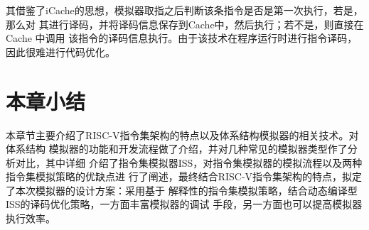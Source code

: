 其借鉴了iCache的思想，模拟器取指之后判断该条指令是否是第一次执行，若是，那么对
其进行译码，并将译码信息保存到Cache中，然后执行；若不是，则直接在 Cache 中调用
该指令的译码信息执行。由于该技术在程序运行时进行指令译码，因此很难进行代码优化。

\section{本章小结}
本章节主要介绍了RISC-V指令集架构的特点以及体系结构模拟器的相关技术。对体系结构
模拟器的功能和开发流程做了介绍，并对几种常见的模拟器类型作了分析对比，其中详细
介绍了指令集模拟器ISS，对指令集模拟器的模拟流程以及两种指令集模拟策略的优缺点进
行了阐述，最终结合RISC-V指令集架构的特点，拟定了本次模拟器的设计方案：采用基于
解释性的指令集模拟策略，结合动态编译型ISS的译码优化策略，一方面丰富模拟器的调试
手段，另一方面也可以提高模拟器执行效率。